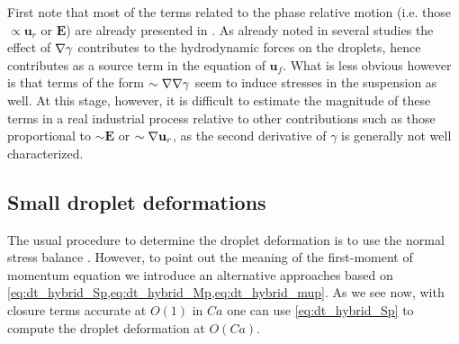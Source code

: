 First note that most of the terms related to the phase relative motion (i.e. those $\propto \textbf{u}_r$ or $\textbf{E}$) are already presented in \citet[Appendix A]{zhang1997momentum}. 
As already noted in several studies the effect of $\mathbf{\nabla} \gamma$ contributes to the hydrodynamic forces on the droplets\citep{Subramanian_1985}, hence contributes as a source term in the equation of $\textbf{u}_f$. 
What is less obvious however is that terms of the form $\sim \mathbf{\nabla}\mathbf{\nabla}\gamma$ seem to induce stresses in the suspension as well.
At this stage, however, it is difficult to estimate the magnitude of these terms in a real industrial process relative to other contributions such as those proportional to $\sim \textbf{E}$ or $\sim \mathbf{\nabla} \textbf{u}_r$, as the second derivative of $\gamma$ is generally not well characterized.  


\subsection{Small droplet deformations}

The usual procedure to determine the droplet deformation is to use the normal stress balance \citep{nadim1991motion,nadim1996concise}. 
However, to point out the meaning of the first-moment of momentum equation we introduce an alternative approaches based on \ref{eq:dt_hybrid_Sp,eq:dt_hybrid_Mp,eq:dt_hybrid_mup}. 
As we  see now, with closure terms accurate at $O(1)$ in $Ca$ one can use \ref{eq:dt_hybrid_Sp} to compute the droplet deformation at $O(Ca)$. 

